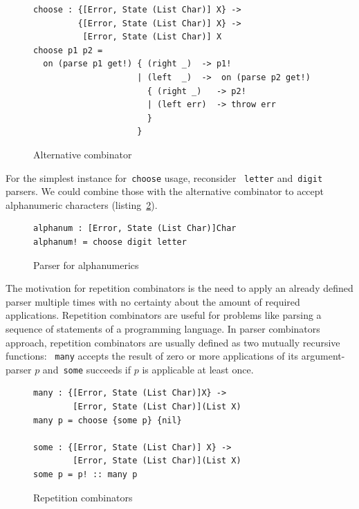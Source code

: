    \begin{figure}[h]
    \begin{lstlisting}
choose : {[Error, State (List Char)] X} ->
         {[Error, State (List Char)] X} ->
          [Error, State (List Char)] X
choose p1 p2 =
  on (parse p1 get!) { (right _)  -> p1!
                     | (left  _)  ->  on (parse p2 get!)
                       { (right _)   -> p2!
                       | (left err)  -> throw err
                       }
                     }
    \end{lstlisting}
    \caption{Alternative combinator}
    \label{listing:parserChooseCombo}
    \end{figure}

    For the simplest instance for~\texttt{choose} usage, reconsider
    ~\texttt{letter} and~\texttt{digit} parsers. We could combine those with the
    alternative combinator to accept alphanumeric characters
    (listing~\ref{listing:parserAlphanumCombo}).

    \begin{figure}[h]
    \begin{lstlisting}
alphanum : [Error, State (List Char)]Char
alphanum! = choose digit letter
    \end{lstlisting}
    \caption{Parser for alphanumerics}
    \label{listing:parserAlphanumCombo}
    \end{figure}

    The motivation for repetition combinators is the need to apply an already defined
    parser multiple times with no certainty about the amount of required applications.
    Repetition combinators are useful for problems like parsing a sequence
    of statements of a programming language. In parser combinators approach,
    repetition combinators are usually defined as two mutually recursive functions:
    ~\texttt{many} accepts the result of zero or more applications of its
    argument-parser $p$ and~\texttt{some} succeeds if $p$ is applicable at least
    once.

    \begin{figure}[h]
    \begin{lstlisting}
many : {[Error, State (List Char)]X} ->
        [Error, State (List Char)](List X)
many p = choose {some p} {nil}

some : {[Error, State (List Char)] X} ->
        [Error, State (List Char)](List X)
some p = p! :: many p
    \end{lstlisting}
    \caption{Repetition combinators}
    \label{listing:parserManyCombo}
    \end{figure}

